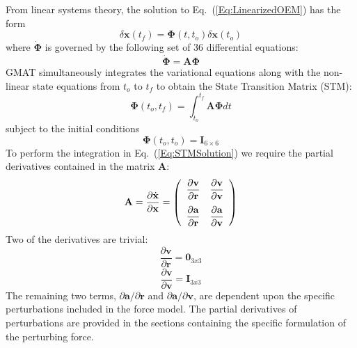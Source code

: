 From linear systems theory, the solution to Eq.~(\ref{Eq:LinearizedOEM}) has the form
%
\begin{equation}
     \delta \mathbf{x}(t_f) = \boldsymbol{\Phi}(t,t_o)\delta \mathbf{x}(t_o)
\end{equation}
%
where $\dot{\boldsymbol{\Phi}}$ is governed by the following set of 36 differential equations:
%
\begin{equation}
     \dot{\boldsymbol{\Phi}} = \mathbf{A}\boldsymbol{\Phi}
\end{equation}
%
GMAT simultaneously integrates the variational equations along with the non-linear state equations from $t_o$ to $t_f$ to obtain the State Transition Matrix (STM):
%
\begin{equation}
     \boldsymbol{\Phi}(t_o,t_f) = \int_{t_o}^{t_f}\mathbf{A}\boldsymbol{\Phi} dt \label{Eq:STMSolution}
\end{equation}
%
subject to the initial conditions
%
\begin{equation}
     \boldsymbol{\Phi}(t_o,t_o) = \mathbf{I}_{6\times6}
\end{equation}
%
To perform the integration in Eq.~(\ref{Eq:STMSolution}) we require the partial derivatives contained in the matrix $\mathbf{A}$:
%
\begin{equation}
     \mathbf{A} = \frac{\partial \dot{\mathbf{x}}}{\partial
     \mathbf{x}}=
     \left(\begin{array}{ccc}
              \displaystyle\frac{\partial \mathbf{v}}{\partial \mathbf{r}} & \displaystyle\frac{\partial \mathbf{v}}{\partial
              \mathbf{v}}\vspace{.1 in}\\
              \displaystyle\frac{\partial \mathbf{a}}{\partial \mathbf{r}} & \displaystyle\frac{\partial \mathbf{a}}{\partial
              \mathbf{v}}
     \end{array}\right)
\end{equation}
%
Two of the derivatives are trivial:
%
\begin{equation}
     \displaystyle\frac{\partial \mathbf{v}}{\partial \mathbf{r}} = \mathbf{0}_{3x3}
\end{equation}
%
%
\begin{equation}
     \displaystyle\frac{\partial \mathbf{v}}{\partial \mathbf{v}} = \mathbf{I}_{3x3}
\end{equation}
%
The remaining two terms, $\partial\mathbf{a}/\partial\mathbf{r}$
and $\partial \mathbf{a}/\partial \mathbf{v}$, are dependent upon the specific perturbations included in the force model.  The partial derivatives of perturbations are provided in the sections containing the specific formulation of the perturbing force.

